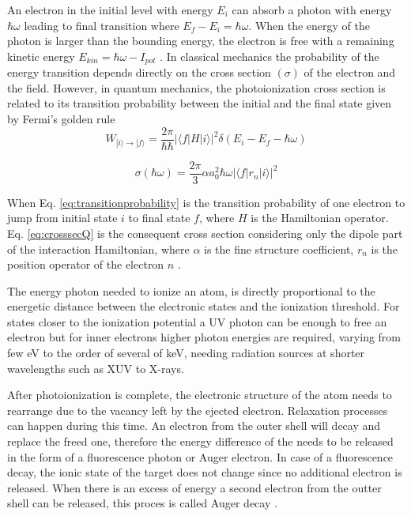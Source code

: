 An electron in the initial level with energy $E_{i}$ can absorb a photon with energy $\hbar \omega$ leading to final transition where $E_{f}-E_{i}=\hbar \omega$. When the energy of the photon is larger than the bounding energy, the electron is free with a remaining kinetic energy $E_{kin} = \hbar \omega - I_{pot}$ \cite{becker_vuv_1996}.
In classical mechanics the probability of the energy transition depends directly on the cross section $(\sigma)$ of the electron and the field. However, in quantum mechanics, the photoionization cross section is related to its transition probability between the initial and the final state given by Fermi’s golden rule \cite{fermi_quantum_1932}
 \begin{equation} 
 \label{eq:transitionprobability}
W_{|i\rangle \rightarrow |f\rangle} = \frac{2\pi}{\hbar\hbar} |\langle f|H|i\rangle|^{2} \delta(E_{i} - E_{f}-\hbar\omega)
 \end{equation}
 
 \begin{equation}
 \label{eq:crosssecQ}
 \sigma(\hbar \omega) = \frac{2\pi}{3} \alpha a_{0}^{2} \hbar \omega |\langle f|r_{n}|i\rangle|^{2}
 \end{equation}
 
When Eq. \ref{eq:transitionprobability} is the transition probability of one electron to jump from initial state $i$ to final state $f$, where $H$ is the Hamiltonian operator. Eq. \ref{eq:crosssecQ} is the consequent cross section considering only the dipole part of the interaction Hamiltonian, where $\alpha$ is the fine structure coefficient, $r_{n}$ is the position operator of the electron $n$ \cite{fermi_quantum_1932}.

The energy photon needed to ionize an atom, is directly proportional to the energetic distance between the electronic states and the ionization threshold. For states closer to the ionization potential a UV photon can be enough to free an electron but for inner electrons higher photon energies are required, varying from few eV to the order of several of keV, needing radiation sources at shorter wavelengths such as XUV to X-rays.\cite{becker_vuv_1996}

After photoionization is complete, the electronic structure of the atom needs to rearrange due to the vacancy left by the ejected electron. Relaxation processes can happen during this time. An electron from the outer shell will decay and replace the freed one, therefore the energy difference of the needs to be released in the form of a fluorescence photon or Auger electron. In case of a fluorescence decay, the ionic state of the target does not change since no additional electron is released. When there is an excess of energy  a second electron from the outter shell can be released, this proces is called Auger decay \cite{rafipoor_two-color_2017}.


